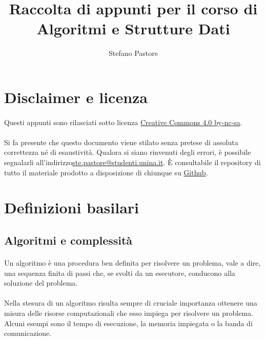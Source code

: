 \documentclass[11pt,a4paper,oneside]{article}
\title{Raccolta di appunti per il corso di\\\Huge{Algoritmi e Strutture Dati}}
\author{Stefano Pastore}
\begin{document}

\maketitle
\pagebreak
\tableofcontents
\pagebreak

\section*{Disclaimer e licenza}
\paragraph*{} Questi appunti sono rilasciati sotto licenza \href{https://creativecommons.org/licenses/by-nc-sa/4.0/}{Creative Commons 4.0 by-nc-sa}.
\paragraph*{} Si fa presente che questo documento viene stilato senza pretese di assoluta correttezza né di esaustività. Qualora si siano rinvenuti degli errori, è possibile segnalarli all'indirizzo\linebreak \href{mailto:ste.pastore@studenti.unina.it}{ste.pastore@studenti.unina.it}. È consultabile il repository di tutto il materiale prodotto a disposizione di chiunque su \href{https://github.com/stefano-pastore/asd}{Github}.
\pagebreak
\section{Definizioni basilari}
\subsection{Algoritmi e complessità}
\paragraph*{} Un algoritmo è una procedura ben definita per risolvere un problema, vale a dire, una sequenza finita di passi che, se svolti da un esecutore, conducono alla soluzione del problema.
\paragraph*{} Nella stesura di un algoritmo risulta sempre di cruciale importanza ottenere una misura delle risorse computazionali che esso impiega per risolvere un problema. Alcuni esempi sono il tempo di esecuzione, la memoria impiegata o la banda di comunicazione.
\end{document}
